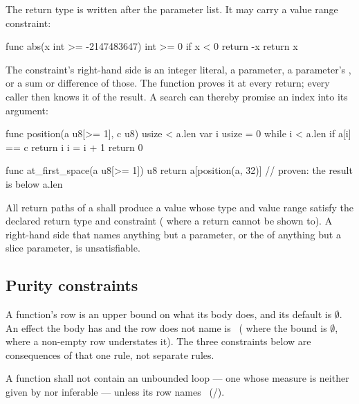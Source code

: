 \pnum
The return type is written after the parameter list.  It may carry a value
range constraint:

\begin{laincode}
func abs(x int >= -2147483647) int >= 0 {
    if x < 0 { return -x }
    return x
}
\end{laincode}

\pnum
The constraint's right-hand side is an integer literal, a parameter, a parameter's
, or a sum or difference of those. The function proves it at every return; every
caller then knows it of the result. A search can thereby promise an index into its argument:

\begin{laincode}
func position(a u8[>= 1], c u8) usize < a.len {
    var i usize = 0
    while i < a.len {
        if a[i] == c { return i }
        i = i + 1
    }
    return 0
}

func at_first_space(a u8[>= 1]) u8 {
    return a[position(a, 32)]   // proven: the result is below a.len
}
\end{laincode}

\begin{constraint}
  All return paths of a  shall produce a value whose type and
  value range satisfy the declared return type and constraint
  ( where a return cannot be shown to). A right-hand side that names anything
  but a parameter, or the  of anything but a slice parameter, is unsatisfiable.
\end{constraint}

\subsection{Purity constraints}
\label{sec:decl.func.purity}

\begin{constraint}
  A function's  row is an upper bound on what its body does, and its
  default is $\emptyset$.  An effect the body has and the row does not name is
  \illformed{}~( where the bound is $\emptyset$,
   where a non-empty row understates it).  The three
  constraints below are consequences of that one rule, not separate rules.
\end{constraint}

\begin{constraint}
  A function shall not contain an unbounded  loop --- one whose
  measure is neither given by  nor inferable --- unless its row
  names ~(/).
\end{constraint}

